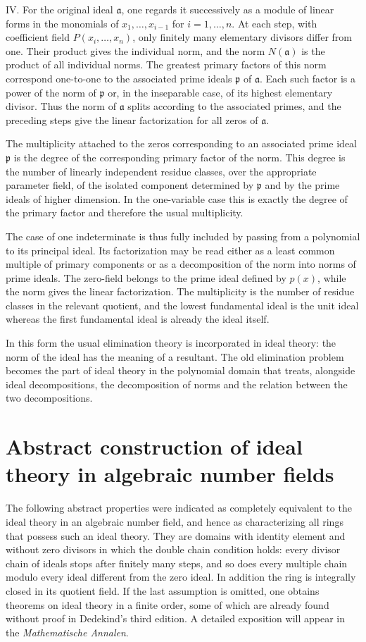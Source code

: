 \documentclass[11pt]{article}
\begin{document}
IV. For the original ideal $\mathfrak a$, one regards it successively as a module of linear forms in the monomials of $x_1,\ldots,x_{i-1}$ for $i=1,\ldots,n$. At each step, with coefficient field $P(x_i,
\ldots,x_n)$, only finitely many elementary divisors differ from one. Their product gives the individual norm, and the norm $N(\mathfrak a)$ is the product of all individual norms. The greatest primary factors of this norm correspond one-to-one to the associated prime ideals $\mathfrak p$ of $\mathfrak a$. Each such factor is a power of the norm of $\mathfrak p$ or, in the inseparable case, of its highest elementary divisor. Thus the norm of $\mathfrak a$ splits according to the associated primes, and the preceding steps give the linear factorization for all zeros of $\mathfrak a$.

The multiplicity attached to the zeros corresponding to an associated prime ideal $\mathfrak p$ is the degree of the corresponding primary factor of the norm. This degree is the number of linearly independent residue classes, over the appropriate parameter field, of the isolated component determined by $\mathfrak p$ and by the prime ideals of higher dimension. In the one-variable case this is exactly the degree of the primary factor and therefore the usual multiplicity.

The case of one indeterminate is thus fully included by passing from a polynomial to its principal ideal. Its factorization may be read either as a least common multiple of primary components or as a decomposition of the norm into norms of prime ideals. The zero-field belongs to the prime ideal defined by $p(x)$, while the norm gives the linear factorization. The multiplicity is the number of residue classes in the relevant quotient, and the lowest fundamental ideal is the unit ideal whereas the first fundamental ideal is already the ideal itself.

In this form the usual elimination theory is incorporated in ideal theory: the norm of the ideal has the meaning of a resultant. The old elimination problem becomes the part of ideal theory in the polynomial domain that treats, alongside ideal decompositions, the decomposition of norms and the relation between the two decompositions.

\section{Abstract construction of ideal theory in algebraic number fields}

The following abstract properties were indicated as completely equivalent to the ideal theory in an algebraic number field, and hence as characterizing all rings that possess such an ideal theory. They are domains with identity element and without zero divisors in which the double chain condition holds: every divisor chain of ideals stops after finitely many steps, and so does every multiple chain modulo every ideal different from the zero ideal. In addition the ring is integrally closed in its quotient field. If the last assumption is omitted, one obtains theorems on ideal theory in a finite order, some of which are already found without proof in Dedekind's third edition. A detailed exposition will appear in the \emph{Mathematische Annalen}.
\end{document}
